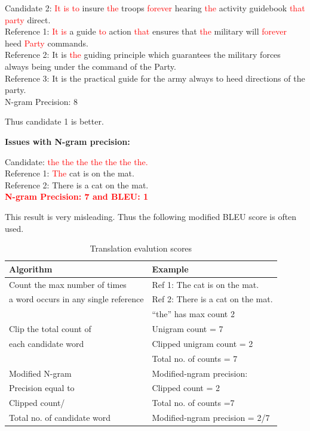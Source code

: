 \documentclass[a4paper]{article}
\newcommand{\red}[1]{\textcolor{red}{#1}}
\begin{document}
Candidate 2: \red{It is to} insure \red {the} troops \red {forever} hearing \red
{the} activity guidebook \red{that party} direct. \\
Reference 1: \red {It is} a guide \red {to} action \red {that} ensures that \red
{the} military will  \red{forever} heed \red{Party} commands. \\ Reference 2: It
is \red{the} guiding principle which guarantees the
military forces always being under the command of the Party. \\ Reference 3:  It
is the practical guide for the army always to heed directions of the party. \\
N-gram Precision: 8

Thus candidate 1 is better.

\textbf{Issues with N-gram precision:}

Candidate: \red{the the the the the the the.} \\
Reference 1: \red{The} cat is on the mat. \\
Reference 2: There is a cat on the mat. \\

\textbf{\red{N-gram Precision: 7 and BLEU: 1}}

This result is  very misleading. Thus the following modified BLEU score is often
used.


\begin{table}[h]
  \centering
  \begin{tabular}{ll}
    \hline
    \textbf{Algorithm}  & \textbf{Example}  \\
    \hline
    Count the max number of times & Ref 1: The cat is on the mat.  \\
    a word occurs in any single reference & Ref 2: There is a cat on the mat. \\
    & “the” has max count 2 \\
    \hline
    Clip the total count of & Unigram count = 7 \\
    each candidate word & Clipped unigram count = 2 \\
    &Total no. of counts = 7 \\
    \hline
    Modified N-gram & Modified-ngram precision: \\
    Precision equal to & Clipped count = 2 \\
    Clipped count/ & Total no. of counts =7 \\
    Total no. of candidate word & Modified-ngram precision = 2/7\\
    \hline
  \end{tabular}
  \caption{Translation evalution scores}
\end{table}
\end{document}
